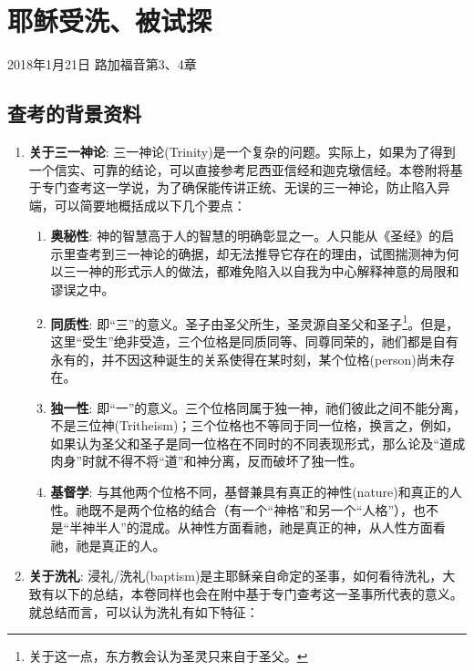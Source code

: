 \chapter{耶稣受洗、被试探}

2018年1月21日 \hfill 路加福音第3、4章



\section{查考的背景资料}

\begin{enumerate}
  \item \textbf{关于三一神论}: 三一神论(Trinity)是一个复杂的问题。实际上，如果为了得到一个信实、可靠的结论，可以直接参考尼西亚信经\cite{book:NiceneLSB}和迦克墩信经\cite{book:ChalcedonBCP}。本卷附将基于\cite{book:sproul2011trinity}专门查考这一学说，为了确保能传讲正统、无误的三一神论，防止陷入异端，可以简要地概括成以下几个要点：
  \begin{enumerate}
    \item \textbf{奥秘性}: 神的智慧高于人的智慧的明确彰显之一。人只能从《圣经》的启示里查考到三一神论的确据，却无法推导它存在的理由，试图揣测神为何以三一神的形式示人的做法，都难免陷入以自我为中心解释神意的局限和谬误之中。
    \item \textbf{同质性}: 即“三”的意义。圣子由圣父所生，圣灵源自圣父和圣子\footnote{关于这一点，东方教会认为圣灵只来自于圣父。}。但是，这里“受生”绝非受造，三个位格是同质同等、同尊同荣的，祂们都是自有永有的，并不因这种诞生的关系使得在某时刻，某个位格(person)尚未存在。
    \item \textbf{独一性}: 即“一”的意义。三个位格同属于独一神，祂们彼此之间不能分离，不是三位神(Tritheism)；三个位格也不等同于同一位格，换言之，例如，如果认为圣父和圣子是同一位格在不同时的不同表现形式，那么论及“道成肉身”时就不得不将“道”和神分离，反而破坏了独一性。
    \item \textbf{基督学}: 与其他两个位格不同，基督兼具有真正的神性(nature)和真正的人性。祂既不是两个位格的结合（有一个“神格”和另一个“人格”），也不是“半神半人”的混成。从神性方面看祂，祂是真正的神，从人性方面看祂，祂是真正的人。
  \end{enumerate}
  \item \textbf{关于洗礼}: 浸礼/洗礼(baptism)是主耶稣亲自命定的圣事，如何看待洗礼，大致有以下的总结，本卷同样也会在附中基于\cite{book:sproul2011baptism}专门查考这一圣事所代表的意义。就总结而言，可以认为洗礼有如下特征：

\end{enumerate}

